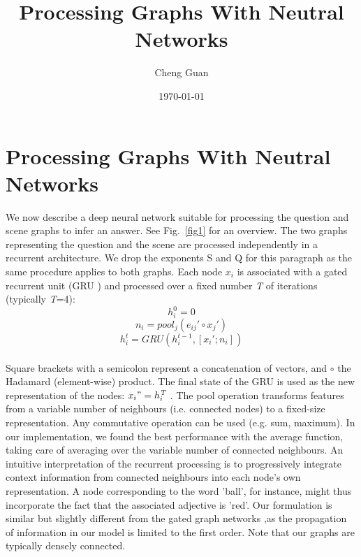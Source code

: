 \documentclass[10pt,twocolumn,a4paper]{article}
\title{Processing Graphs With Neutral Networks}
\author{Cheng Guan}
\date{\today}
\begin{document}
\maketitle
\section{Processing Graphs With Neutral Networks}
We now describe a deep neural network suitable for processing the question
and scene graphs to infer an answer. See Fig.~\ref{fig1} for an overview.
The two graphs representing the question and the scene are processed independently in a recurrent architecture. We drop the exponents S and Q for this paragraph as the same procedure applies to both graphs.
Each node $x_i$ is associated with a gated recurrent unit
(GRU \cite{c1}) and processed over a ﬁxed number \emph{T} of iterations (typically \emph{T}=4):
\begin{equation}
h_i^0 = 0
\end{equation}
\begin{equation}
n_i=pool_j \left ({e_{ij}}' \circ {x_j}' \right)
\end{equation}
\begin{equation}
h_i^t=GRU\left( h_i^{t-1},\left [{x_i}';n_i \right] \right)
\end{equation}\\
Square brackets with a semicolon represent a concatenation of vectors,
and $\circ$ the Hadamard (element-wise) product. The ﬁnal state of the GRU is used as
 the new representation of the nodes: ${x_i}"=h_i^{\emph{T}}$ . The pool operation transforms features from a variable number of neighbours (i.e. connected nodes) to a ﬁxed-size representation. Any commutative operation can be used (e.g. sum, maximum). In our implementation, we found the best performance with the average function, taking care of averaging over the variable number of connected neighbours. An intuitive interpretation of the recurrent processing is to progressively integrate context information from connected neighbours into each node’s own representation.
 A node corresponding to the word ’ball’, for instance, might thus incorporate
 the fact that the associated adjective is ’red’. Our formulation is similar but
 slightly different from the gated graph networks \cite{c2},as the propagation of information in our model is limited to the ﬁrst order.
  Note that our graphs are typically densely connected.
\end{document}
